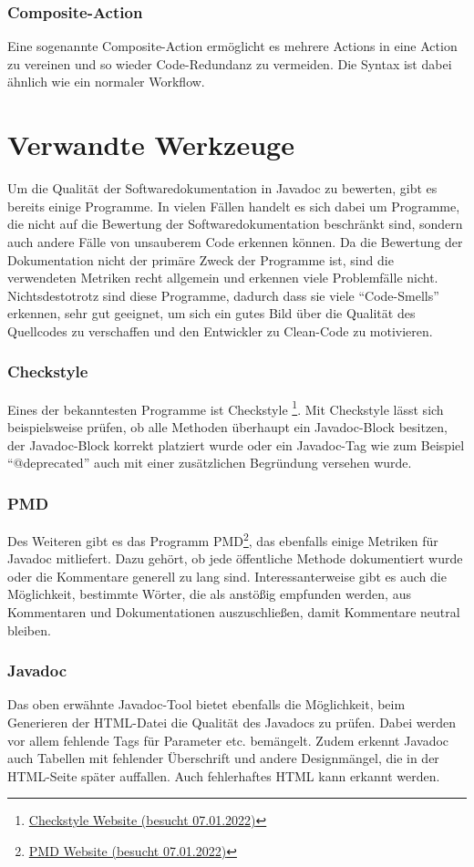\subsubsection{Composite-Action}
Eine sogenannte Composite-Action ermöglicht es mehrere Actions in eine Action zu vereinen und so wieder Code-Redundanz zu vermeiden. Die Syntax ist dabei ähnlich wie ein normaler Workflow. 


\section{Verwandte Werkzeuge}
Um die Qualität der Softwaredokumentation in Javadoc zu bewerten, gibt es bereits einige Programme. In vielen Fällen handelt es sich dabei um Programme, die nicht auf die Bewertung der Softwaredokumentation beschränkt sind, sondern auch andere Fälle von unsauberem Code erkennen können. Da die Bewertung der Dokumentation nicht der primäre Zweck der Programme ist, sind die verwendeten Metriken recht allgemein und erkennen viele Problemfälle nicht. Nichtsdestotrotz sind diese Programme, dadurch dass sie viele \enquote{Code-Smells} erkennen, sehr gut geeignet, um sich ein gutes Bild über die Qualität des Quellcodes zu verschaffen und den Entwickler zu Clean-Code zu motivieren. 
\subsubsection{Checkstyle}
Eines der bekanntesten Programme ist Checkstyle \footnote{\href{https://checkstyle.sourceforge.io/}{Checkstyle Website (besucht 07.01.2022)}}. Mit Checkstyle lässt sich beispielsweise prüfen, ob alle Methoden überhaupt ein Javadoc-Block besitzen, der Javadoc-Block korrekt platziert wurde oder ein Javadoc-Tag wie zum Beispiel \enquote{@deprecated} auch mit einer zusätzlichen Begründung versehen wurde. 
\subsubsection{PMD}
Des Weiteren gibt es das Programm PMD\footnote{\href{https://pmd.github.io/}{PMD Website (besucht 07.01.2022)}}, das ebenfalls einige Metriken für Javadoc mitliefert. Dazu gehört, ob jede öffentliche Methode dokumentiert wurde oder die Kommentare generell zu lang sind. Interessanterweise gibt es auch die Möglichkeit, bestimmte Wörter, die als anstößig empfunden werden, aus Kommentaren und Dokumentationen auszuschließen, damit Kommentare neutral bleiben. 
\subsubsection{Javadoc}
Das oben erwähnte Javadoc-Tool bietet ebenfalls die Möglichkeit, beim Generieren der HTML-Datei die Qualität des Javadocs zu prüfen. Dabei werden vor allem fehlende Tags für Parameter etc. bemängelt. Zudem erkennt Javadoc auch Tabellen mit fehlender Überschrift und andere Designmängel, die in der HTML-Seite später auffallen. Auch fehlerhaftes HTML kann erkannt werden.

